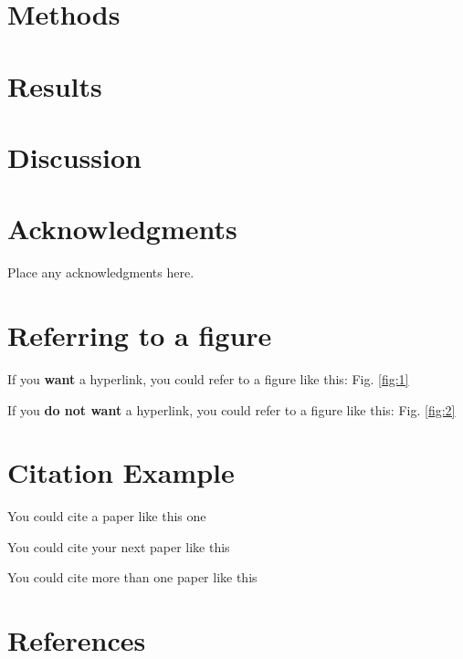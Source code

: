 \documentclass[balance,upint,subscriptcorrection,varvw,mathalfa=cal=boondoxo,spanish,french,russian,greek,pdf-a,fontspec,colorlinks]{sb3c}
\begin{document}


\section*{Methods}
\blindtext[6]


\section*{Results}
\blindtext[4]


\section*{Discussion}
\blindtext[1]


\section*{Acknowledgments}
Place any acknowledgments here.


\section*{Referring to a figure}

If you \textbf{want} a hyperlink, you could refer to a figure like this: Fig. \ref{fig:1}

If you \textbf{do not want} a hyperlink, you could refer to a figure like this: Fig. \ref*{fig:2}


\section*{Citation Example}

You could cite a paper like this one \autocite{A00}

You could cite your next paper like this \autocite{C02}

You could cite more than one paper like this \autocite{A00, B01, C02}


\section*{References}
\noindent
\printbibliography[heading=none]

\vspace{-2em}
\end{document}
